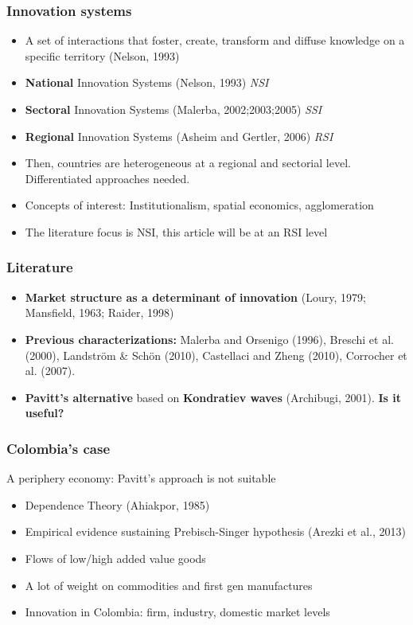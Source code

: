 \documentclass{beamer}
\begin{document}
	\begin{frame}[allowframebreaks]
		\frametitle{Innovation systems}
		\begin{itemize}
			\item A set of interactions that foster, create, transform and diffuse
			knowledge on a specific territory (Nelson, 1993)
			\item \textbf{National} Innovation Systems (Nelson, 1993) \textit{NSI}
			\item \textbf{Sectoral} Innovation Systems (Malerba, 2002;2003;2005) \textit{SSI}
			\item \textbf{Regional} Innovation Systems (Asheim and Gertler, 2006) \textit{RSI}
			\item Then, countries are heterogeneous at a regional and sectorial level. Differentiated approaches needed.
			\item Concepts of interest: Institutionalism, spatial economics, agglomeration
			\item The literature focus is NSI, this article will be at an RSI level
		\end{itemize}
	\end{frame}
	\begin{frame}
		\frametitle{Literature}
		\begin{itemize}
			\item \textbf{Market structure as a determinant of innovation} (Loury, 1979; Mansfield, 1963; Raider, 1998)
			\item \textbf{Previous characterizations:} Malerba and Orsenigo (1996), Breschi et al. (2000), Landström \& Schön (2010), Castellaci and Zheng (2010), Corrocher et al. (2007).
			\item \textbf{Pavitt's alternative} based on \textbf{Kondratiev waves} (Archibugi, 2001). \textbf{Is it useful?}
			
		\end{itemize}
	\end{frame}
	\begin{frame}
		\frametitle{Colombia's case}
	A periphery economy: Pavitt's approach is not suitable
	\begin{itemize}
		\item Dependence Theory (Ahiakpor, 1985)
		\item Empirical evidence sustaining Prebisch-Singer hypothesis (Arezki et al., 2013)
		\item Flows of low/high added value goods
		\item A lot of weight on commodities and first gen manufactures
		\item Innovation in Colombia: firm, industry, domestic market levels
	\end{itemize}
	\end{frame}
\end{document}
